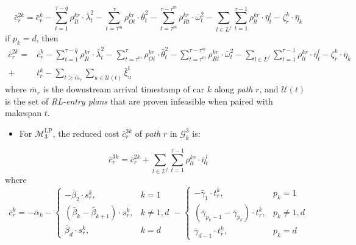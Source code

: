 \documentclass[12pt]{article}
\begin{document}
\begin{equation}\label{rc2}
    \bar{c}^{2k}_r=\bar{c}^k_r
        -\sum_{t=1}^{\tau-\bar{q}}{\rho^{kr}_{It}\cdot \bar{\lambda}^2_t} -\sum_{t=\tau^m}^{\tau}{\rho^{kr}_{Ot}\cdot \bar{\theta}^2_t} - \sum_{t=\tau^m}^{\tau-\tau^m}{\rho^{kr}_{Rt}\cdot \bar{\omega}^2_{t}} - \sum_{l\in L^f}{\sum_{t=1}^{\tau-1}{\rho^{kr}_{lt}}\cdot \bar{\eta}^l_t} - \zeta^k_r\cdot \bar{\eta}_k
\end{equation}
\noindent if $p_k=d$, then
\begin{align}\label{rc2-1}
    \bar{c}^{2k}_r=&\bar{c}^k_r
        -\sum_{t=1}^{\tau-\bar{q}}{\rho^{kr}_{It}\cdot \bar{\lambda}^2_t} -\sum_{t=\tau^m}^{\tau}{\rho^{kr}_{Ot}\cdot \bar{\theta}^2_t} - \sum_{t=\tau^m}^{\tau-\tau^m}{\rho^{kr}_{Rt}\cdot \bar{\omega}^2_{t}} - \sum_{l\in L^f}{\sum_{t=1}^{\tau-1}{\rho^{kr}_{lt}}\cdot \bar{\eta}^l_t} - \zeta^k_r\cdot \bar{\eta}_k \nonumber \\
        +&t^k_r-\sum_{t\geqslant \bar{m}_r}{\sum_{u\in \mathcal{U}(t)}{\bar{\xi}^{t}_u}}
\end{align}
where $\bar{m}_r$ is the downstream arrival timestamp of car $k$ along \textit{path} $r$, and $\mathcal{U}(t)$ is the set of \textit{RL-entry plans} that are proven infeasible when paired with makespan $t$.

\begin{itemize}[topsep = 0.4pt, itemsep = 0.8pt, parsep = 0pt, labelwidth=0pt, leftmargin=*]
    \item For $\mathcal{M}^{\text{LP}}_3$, the reduced cost $\bar{c}^{3k}_r$ of \textit{path} $r$ in $\mathcal{G}^3_k$ is:
\end{itemize}
\begin{equation}\label{rc3}
    \bar{c}^{3k}_{r}=\bar{c}^{2k}_r+\sum_{l\in L^f}{\sum_{t=1}^{\tau-1}{\rho^{kr}_{lt}\cdot\bar{\eta}^l_t}}
\end{equation}
\noindent where
\begin{equation*}
    \bar{c}^{k}_r=-\bar{\alpha}_k -
        \begin{cases}
        -\bar{\beta}_2\cdot s^k_r, &k=1 \\
        (\bar{\beta}_k-\bar{\beta}_{k+1})\cdot s^k_r, &k\neq 1,d \\
        \bar{\beta}_d\cdot s^k_r, &k=d
        \end{cases} -
        \begin{cases}
        -\bar{\gamma}_1\cdot t^k_r, &p_k=1 \\
        (\bar{\gamma}_{p_k-1}-\bar{\gamma}_{p_k})\cdot t^k_r, &p_k\neq 1,d \\
        \bar{\gamma}_{d-1}\cdot t^k_r, &p_k=d
        \end{cases}
\end{equation*}
\end{document}
